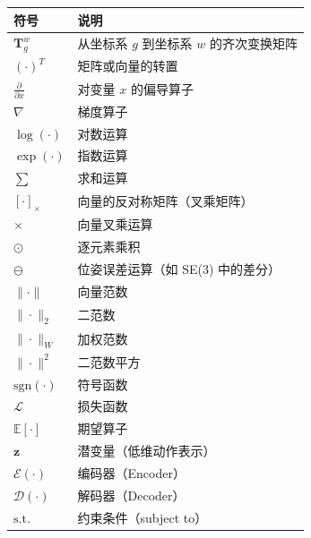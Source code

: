 \noindent
\renewcommand{\arraystretch}{1.3}
\begin{tabular*}{\textwidth}{@{\extracolsep{\fill}}ll}
	\toprule
	符号 & 说明 \\
	\midrule
	
	$\mathbf{T}_{g}^{w}$ & 从坐标系 $g$ 到坐标系 $w$ 的齐次变换矩阵 \\
	$(\cdot)^T$ & 矩阵或向量的转置 \\
	$\frac{\partial}{\partial x}$ & 对变量 $x$ 的偏导算子 \\
	$\nabla$ & 梯度算子 \\
	$\log(\cdot)$ & 对数运算 \\
	$\exp(\cdot)$ & 指数运算 \\
	$\sum$ & 求和运算 \\
	
	$[\cdot]_\times$ & 向量的反对称矩阵（叉乘矩阵） \\
	$\times$ & 向量叉乘运算 \\
	$\odot$ & 逐元素乘积 \\
	$\ominus$ & 位姿误差运算（如 SE(3) 中的差分） \\
	
	$\|\cdot\|$ & 向量范数 \\
	$\|\cdot\|_2$ & 二范数 \\
	$\|\cdot\|_W$ & 加权范数 \\
	$\|\cdot\|^2$ & 二范数平方 \\
	
	$\mathrm{sgn}(\cdot)$ & 符号函数 \\
	
	$\mathcal{L}$ & 损失函数 \\
	$\mathbb{E}[\cdot]$ & 期望算子 \\
	
	$\mathbf{z}$ & 潜变量（低维动作表示） \\
	$\mathcal{E}(\cdot)$ & 编码器（Encoder） \\
	$\mathcal{D}(\cdot)$ & 解码器（Decoder） \\
	
	$\mathrm{s.t.}$ & 约束条件（subject to） \\
	
	\bottomrule
\end{tabular*}